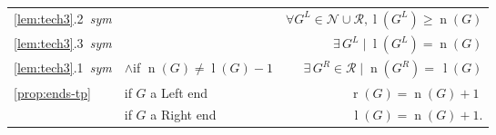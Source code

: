 \documentclass[11pt]{article}
\theoremstyle{definition}
\DeclareMathOperator{\ltp}{l}
\DeclareMathOperator{\ntp}{n}
\DeclareMathOperator{\rtp}{r}
\begin{document}
\begin{table}[h]
\begin{tabular}{l|lr}
    \cref{lem:tech3}.2{\footnotesize \it ~sym}& & $\forall G^L \in 
    \mathscr{N}\cup\mathscr{R},
    \ltp(G^L)\geq\ntp(G)$\\
    \cref{lem:tech3}.3{\footnotesize \it ~sym}& & $\exists \, G^L \mid 
    \ltp(G^L)=\ntp(G)$ \\
    \cmidrule(lr){3-3}
    \cref{lem:tech3}.1{\footnotesize \it ~sym}& \multicolumn{1}{r}{$\land$if 
    $\ntp(G)\neq\ltp(G)-1$}
    &
    $\exists \, G^R \in \mathscr{R}\mid \ntp(G^R)=\hspace{2pt}\ltp(G)$\\
    \cmidrule(lr){1-3}
    \multirow{2}{*}{\cref{prop:ends-tp}} & if $G$ a Left end &
    $\rtp(G)=\ntp(G)+1\;$ \\
    & if $G$ a Right end & $\ltp(G)=\ntp(G)+1$. \\
    \hline
    \hline
\end{tabular}
\label{tab:techs}
\end{table}
\end{document}
